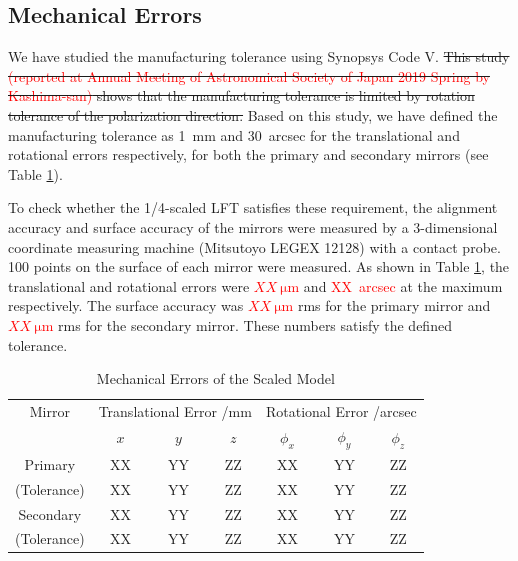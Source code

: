 \documentclass[journal]{IEEEtran}
\newcommand{\red}[1]{\textcolor{red}{#1}}
\begin{document}
\subsection{Mechanical Errors}
%
We have studied the manufacturing tolerance using Synopsys Code V. \sout{This study \red{(reported at Annual Meeting of Astronomical Society of Japan 2019 Spring by Kashima-san)} shows that the manufacturing tolerance is limited by rotation tolerance of the polarization direction.} Based on this study, we have defined the manufacturing tolerance as 1~mm and 30~arcsec for the translational and rotational errors respectively, for both the primary and secondary mirrors (see Table \ref{tb:mech_err}).
\par
To check whether the 1/4-scaled LFT satisfies these requirement, the alignment accuracy and surface accuracy of the mirrors were measured by a 3-dimensional coordinate measuring machine (Mitsutoyo LEGEX 12128) with a contact probe. 100 points on the surface of each mirror were measured. As shown in Table \ref{tb:mech_err}, the translational and rotational errors were \red{$XX~\mathrm{\mu m}$} and \red{XX~arcsec} at the maximum respectively. The surface accuracy was \red{$XX~\mathrm{\mu m}$} rms for the primary mirror and \red{$XX~\mathrm{\mu m}$} rms for the secondary mirror. These numbers satisfy the defined tolerance.
%
\begin{table}[!t]
\renewcommand{\arraystretch}{1.3}
\caption{Mechanical Errors of the Scaled Model}
\label{tb:mech_err}
\centering
\begin{tabular}{|c|ccc|ccc|}
\hline
Mirror & \multicolumn{3}{|c}{Translational Error /mm} & \multicolumn{3}{|c|}{Rotational Error /arcsec} \\
 & $x$ & $y$ & $z$ & $\phi_x$ & $\phi_y$ & $\phi_z$ \\
\hline
Primary & XX & YY & ZZ & XX & YY & ZZ \\
(Tolerance) & XX & YY & ZZ & XX & YY & ZZ \\
\hline
Secondary & XX & YY & ZZ & XX & YY & ZZ \\
(Tolerance) & XX & YY & ZZ & XX & YY & ZZ \\
\hline
\end{tabular}
\end{table}
%
%
\end{document}
